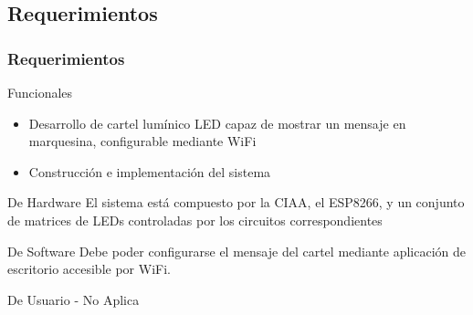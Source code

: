 \subsection{Requerimientos}
\begin{frame}
	\frametitle{Requerimientos}
	\begin{block}{Funcionales}
		\begin{itemize}
			\item Desarrollo de cartel lumínico LED capaz de mostrar un mensaje en marquesina, configurable mediante WiFi
			\item Construcción e implementación del sistema
		\end{itemize}
	\end{block}

	\begin{block}{De Hardware}
		El sistema está compuesto por la CIAA, el ESP8266, y un conjunto de matrices de LEDs controladas por los circuitos correspondientes
	\end{block}

	\begin{block}{De Software}
		Debe poder configurarse el mensaje del cartel mediante aplicación de escritorio accesible por WiFi.
	\end{block}

	\begin{block}{De Usuario - No Aplica}
	\end{block}
\end{frame}
	



